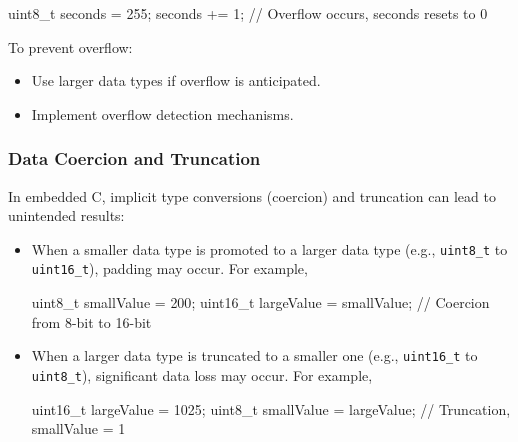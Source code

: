 \documentclass[
  9pt,
  letterpaper,
  abstract,
  titlepage]{scrbook}
\newenvironment{Shaded}{\begin{snugshade}}{\end{snugshade}}
\newcommand{\CommentTok}[1]{\textcolor[rgb]{0.37,0.37,0.37}{#1}}
\newcommand{\DataTypeTok}[1]{\textcolor[rgb]{0.68,0.00,0.00}{#1}}
\newcommand{\DecValTok}[1]{\textcolor[rgb]{0.68,0.00,0.00}{#1}}
\newcommand{\NormalTok}[1]{\textcolor[rgb]{0.00,0.23,0.31}{#1}}
\newcommand{\OperatorTok}[1]{\textcolor[rgb]{0.37,0.37,0.37}{#1}}
\begin{document}
\begin{Shaded}
\begin{Highlighting}[]
\DataTypeTok{uint8\_t}\NormalTok{ seconds }\OperatorTok{=} \DecValTok{255}\OperatorTok{;} 
\NormalTok{seconds }\OperatorTok{+=} \DecValTok{1}\OperatorTok{;} \CommentTok{// Overflow occurs, seconds resets to 0}
\end{Highlighting}
\end{Shaded}

To prevent overflow:

\begin{itemize}
\item
  Use larger data types if overflow is anticipated.
\item
  Implement overflow detection mechanisms.
\end{itemize}

\subsubsection{Data Coercion and
Truncation}\label{data-coercion-and-truncation}

In embedded C, implicit type conversions (coercion) and truncation can
lead to unintended results:

\begin{itemize}
\item
  When a smaller data type is promoted to a larger data type (e.g.,
  \texttt{uint8\_t} to \texttt{uint16\_t}), padding may occur. For
  example,

\begin{Shaded}
\begin{Highlighting}[]
\DataTypeTok{uint8\_t}\NormalTok{ smallValue }\OperatorTok{=} \DecValTok{200}\OperatorTok{;}
\DataTypeTok{uint16\_t}\NormalTok{ largeValue }\OperatorTok{=}\NormalTok{ smallValue}\OperatorTok{;} \CommentTok{// Coercion from 8{-}bit to 16{-}bit}
\end{Highlighting}
\end{Shaded}
\item
  When a larger data type is truncated to a smaller one (e.g.,
  \texttt{uint16\_t} to \texttt{uint8\_t}), significant data loss may
  occur. For example,

\begin{Shaded}
\begin{Highlighting}[]
\DataTypeTok{uint16\_t}\NormalTok{ largeValue }\OperatorTok{=} \DecValTok{1025}\OperatorTok{;}
\DataTypeTok{uint8\_t}\NormalTok{ smallValue }\OperatorTok{=}\NormalTok{ largeValue}\OperatorTok{;} \CommentTok{// Truncation, smallValue = 1}
\end{Highlighting}
\end{Shaded}
\end{itemize}
\end{document}
